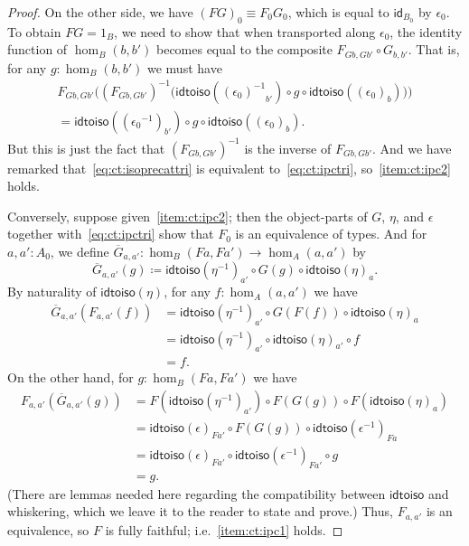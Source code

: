 \documentclass{amsart}
\newcommand{\jdeq}{\equiv}      %
\newcommand{\defeq}{\coloneqq}  %
\newcommand{\opp}[1]{\mathord{{#1}^{-1}}}
\newcommand{\idfunc}[1][]{\ensuremath{\mathsf{id}_{#1}}\xspace}
\theoremstyle{definition}
\theoremstyle{remark}
\numberwithin{equation}{section}
\newcommand{\inv}[1]{{#1}^{-1}}
\newcommand{\idtoiso}{\ensuremath{\mathsf{idtoiso}}\xspace}
\begin{document}
\begin{proof}
  On the other side, we have $(FG)_0\jdeq F_0 G_0$, which is equal to $\idfunc[B_0]$ by $\epsilon_0$.
  To obtain $FG=1_B$, we need to show that when transported along $\epsilon_0$, the identity function of $\hom_B(b,b')$ becomes equal to the composite $F_{Gb,Gb'} \circ G_{b,b'}$.
  That is, for any $g:\hom_B(b,b')$ we must have
  \begin{multline*}
    F_{Gb,Gb'}\Big(\inv{(F_{Gb,Gb'})}\Big(\idtoiso(\opp{(\epsilon_0)}_{b'}) \circ g \circ \idtoiso((\epsilon_0)_b)\Big)\Big)\\
    = \idtoiso((\opp{\epsilon_0})_{b'}) \circ g \circ \idtoiso((\epsilon_0)_b).
  \end{multline*}
  But this is just the fact that $\inv{(F_{Gb,Gb'})}$ is the inverse of $F_{Gb,Gb'}$.
  And we have remarked that~\eqref{eq:ct:isoprecattri} is equivalent to~\eqref{eq:ct:ipctri}, so~\ref{item:ct:ipc2} holds.

  Conversely, suppose given~\ref{item:ct:ipc2}; then the object-parts of $G$, $\eta$, and $\epsilon$ together with~\eqref{eq:ct:ipctri} show that $F_0$ is an equivalence of types.
  And for $a,a':A_0$, we define $\overline{G}_{a,a'}: \hom_B(Fa,Fa') \to \hom_A(a,a')$ by
  \begin{equation}
    \overline{G}_{a,a'}(g) \defeq \idtoiso(\opp{\eta})_{a'} \circ G(g) \circ \idtoiso(\eta)_a.\label{eq:ct:gbar}
  \end{equation}
  By naturality of $\idtoiso(\eta)$, for any $f:\hom_A(a,a')$ we have
  \begin{align*}
    \overline{G}_{a,a'}(F_{a,a'}(f))
    &= \idtoiso(\opp{\eta})_{a'} \circ G(F(f)) \circ \idtoiso(\eta)_a\\
    &= \idtoiso(\opp{\eta})_{a'} \circ \idtoiso(\eta)_{a'} \circ f \\
    &= f.
  \end{align*}
  On the other hand, for $g:\hom_B(Fa,Fa')$ we have
  \begin{align*}
    F_{a,a'}(\overline{G}_{a,a'}(g))
    &= F(\idtoiso(\opp{\eta})_{a'}) \circ F(G(g)) \circ F(\idtoiso(\eta)_a)\\
    &= \idtoiso(\epsilon)_{Fa'}
    \circ F(G(g))
    \circ \idtoiso(\opp{\epsilon})_{Fa}\\
    &= \idtoiso(\epsilon)_{Fa'}
    \circ \idtoiso(\opp{\epsilon})_{Fa'}
    \circ g\\
    &= g.
  \end{align*}
  (There are lemmas needed here regarding the compatibility between \idtoiso and whiskering, which we leave it to the reader to state and prove.)
  Thus, $F_{a,a'}$ is an equivalence, so $F$ is fully faithful; i.e.~\ref{item:ct:ipc1} holds.


\end{proof}
\end{document}

